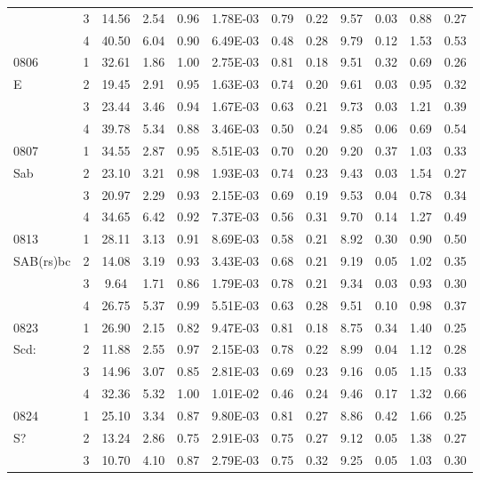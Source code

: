 \begin{center}
\begin{longtable}{lccccccccccc}
	&	3	&	14.56	&	2.54	&	0.96	&	1.78E-03	&	0.79	&	0.22	&	9.57	&	0.03	&	0.88	&	0.27	\\
	&	4	&	40.50	&	6.04	&	0.90	&	6.49E-03	&	0.48	&	0.28	&	9.79	&	0.12	&	1.53	&	0.53	\\
0806	&	1	&	32.61	&	1.86	&	1.00	&	2.75E-03	&	0.81	&	0.18	&	9.51	&	0.32	&	0.69	&	0.26	\\
E 	&	2	&	19.45	&	2.91	&	0.95	&	1.63E-03	&	0.74	&	0.20	&	9.61	&	0.03	&	0.95	&	0.32	\\
	&	3	&	23.44	&	3.46	&	0.94	&	1.67E-03	&	0.63	&	0.21	&	9.73	&	0.03	&	1.21	&	0.39	\\
	&	4	&	39.78	&	5.34	&	0.88	&	3.46E-03	&	0.50	&	0.24	&	9.85	&	0.06	&	0.69	&	0.54	\\
0807	&	1	&	34.55	&	2.87	&	0.95	&	8.51E-03	&	0.70	&	0.20	&	9.20	&	0.37	&	1.03	&	0.33	\\
Sab	&	2	&	23.10	&	3.21	&	0.98	&	1.93E-03	&	0.74	&	0.23	&	9.43	&	0.03	&	1.54	&	0.27	\\
	&	3	&	20.97	&	2.29	&	0.93	&	2.15E-03	&	0.69	&	0.19	&	9.53	&	0.04	&	0.78	&	0.34	\\
	&	4	&	34.65	&	6.42	&	0.92	&	7.37E-03	&	0.56	&	0.31	&	9.70	&	0.14	&	1.27	&	0.49	\\
0813	&	1	&	28.11	&	3.13	&	0.91	&	8.69E-03	&	0.58	&	0.21	&	8.92	&	0.30	&	0.90	&	0.50	\\
SAB(rs)bc	&	2	&	14.08	&	3.19	&	0.93	&	3.43E-03	&	0.68	&	0.21	&	9.19	&	0.05	&	1.02	&	0.35	\\
	&	3	&	9.64	&	1.71	&	0.86	&	1.79E-03	&	0.78	&	0.21	&	9.34	&	0.03	&	0.93	&	0.30	\\
	&	4	&	26.75	&	5.37	&	0.99	&	5.51E-03	&	0.63	&	0.28	&	9.51	&	0.10	&	0.98	&	0.37	\\
0823	&	1	&	26.90	&	2.15	&	0.82	&	9.47E-03	&	0.81	&	0.18	&	8.75	&	0.34	&	1.40	&	0.25	\\
Scd:	&	2	&	11.88	&	2.55	&	0.97	&	2.15E-03	&	0.78	&	0.22	&	8.99	&	0.04	&	1.12	&	0.28	\\
	&	3	&	14.96	&	3.07	&	0.85	&	2.81E-03	&	0.69	&	0.23	&	9.16	&	0.05	&	1.15	&	0.33	\\
	&	4	&	32.36	&	5.32	&	1.00	&	1.01E-02	&	0.46	&	0.24	&	9.46	&	0.17	&	1.32	&	0.66	\\
0824	&	1	&	25.10	&	3.34	&	0.87	&	9.80E-03	&	0.81	&	0.27	&	8.86	&	0.42	&	1.66	&	0.25	\\
S?	&	2	&	13.24	&	2.86	&	0.75	&	2.91E-03	&	0.75	&	0.27	&	9.12	&	0.05	&	1.38	&	0.27	\\
	&	3	&	10.70	&	4.10	&	0.87	&	2.79E-03	&	0.75	&	0.32	&	9.25	&	0.05	&	1.03	&	0.30	\\

\end{longtable}
\end{center}
